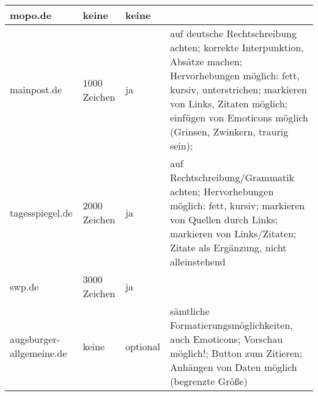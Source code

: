 \begin{landscape}
\begin{longtable}{l|llp{100mm}}
mopo.de			& keine & keine & \\\hline
mainpost.de		& 1000 Zeichen & ja & auf deutsche Rechtschreibung achten; korrekte Interpunktion, Absätze machen; Hervorhebungen möglich: fett, kursiv, unterstrichen; markieren von Links, Zitaten möglich; einfügen von Emoticons möglich (Grinsen, Zwinkern, traurig sein); \\\hline
tagesspiegel.de		& 2000 Zeichen & ja & auf Rechtschreibung/Grammatik achten; Hervorhebungen möglich: fett, kursiv; markieren von Quellen durch Links; markieren von Links/Zitaten; Zitate als Ergänzung, nicht alleinstehend \\\hline
swp.de			& 3000 Zeichen & ja & \\ \hline
augsburger-allgemeine.de	& keine & optional & sämtliche Formatierungsmöglichkeiten, auch Emoticons; Vorschau möglich!; Button zum Zitieren; Anhängen von Daten möglich (begrenzte Größe)\\ \hline

\end{longtable}
\end{landscape}


